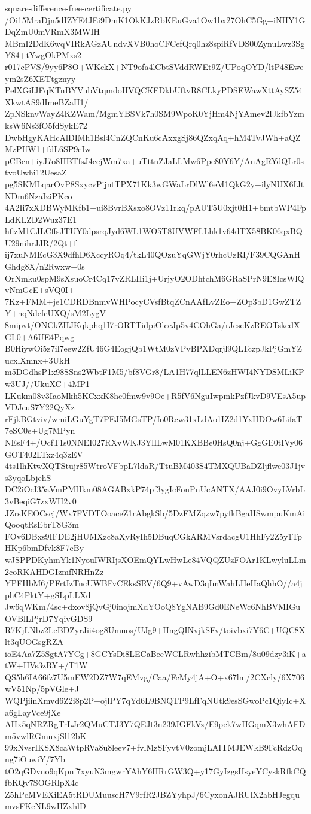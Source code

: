 \documentclass[11pt]{article}
\theoremstyle{definition}
\theoremstyle{remark}
\begin{document}
\begin{filecontents*}[overwrite]{square-difference-free-certificate.py}
/Oi15MraDjn5dIZYE4JEi9DmK1OkKJzRbKEuGva1Ow1bx27OhC5Gg+iNHY1GDqZmU0mVRmX3MWIH
MBmI2DdK6wqVIRkAGzAUndvXVB0hoCFCefQrq0hz8spiRfVDS00ZynuLwz3SgY84+tYwgOkPMxs2
r017cPVS/9yy6P8O+WKckX+NT9ofa4lCbtSVddRWEt9Z/UPoqOYD/ltP48Eweym2sZ6XETtgznyy
PelXGiIJFqKTnBYVubVtqmdoHVQCKFDkbUftvR8CLkyPDSEWawXttAySZ54XkwtAS9dImeBZaH1/
ZpNSknvWayZ4KZWam/MgmYBSVk7h0SM9WpoK0YjHm4NjYAmev2IJkfbYzmksW6Ns3fO5fdSykE72
DwbHgyKAHcAlDIMh1Bsl4CnZQCnKu6cAxxgSj86QZxqAq+hM4TvJWh+aQZMzPIfW1+fdL6SP9eIw
pCBcn+iyJ7o8HBTfsJ4ccjWm7xa+uTttnZJaLLMw6Ppe80Y6Y/AnAgRYdQLr0stvoUwhi12UesaZ
pg5SKMLqarOvP8SxycvPijntTPX71Kk3wGWaLrDlWl6eM1QkG2y+ilyNUX6IJtNDm6NzaIziPKco
4A2Ii7xXDBWyMKfb1+ui8BvrBXsxo8OVz11rkq/pAUT5U0xjt0H1+bmtbWP4FpLdKLZD2Wuz37E1
hflzM1CJLCffsJTUY0dpsrqJyd6WL1WO5T8UVWFLLhk1v64dTX58BK06qxBQU29nihrJJR/2Qt+f
ij7xuNMEcG3X9dfhD6XccyROq4/tkL40QOzuYqGWjY0rhcUzRI/F39CQGAnHGhdg8X/n2Rwxw+0s
OrNmku0spM9sXsuoCr4Cq17vZRLIIi1j+UrjyO2ODhtchM6GRaSPrN9E8IcsWlQvNmGcE+sVQ0I+
7Kz+FMM+je1CDRDBnmvWHPocyCVsfBtqZCnAAfLvZEo+ZOp3bD1GwZTZY+nqNdefcUXQ/sM2LygV
8mipvt/ONCkZHJKqkphq1I7rORTTidpiOlceJp5v4COhGa/rJcseKzREOTskedXGL0+A6UE4Pqwg
B0HiywOi5z7il7eew2ZfU46G4EogjQb1WtM0zVPvBPXDqrjl9QLTczpJkPjGmYZucxlXmnx+3UkH
m5DGdhsP1x98SSns2WbtF1M5/bf8VGr8/LA1H77qlLLEN6zHWI4NYDSMLiKPw3UJ//UkuXC+4MP1
LKukm08v3IaoMkh5KCxxK8hc0fmw9v9Oe+R5fV6NguIwpmkPzfJkvD9VEsA5upVDJcuS7Y22QyXz
rFjkBGtviv/wmiLGuYgT7PEJ5MGsTP/Io0Rcw31xLdAo1IZ2d1YxHDOw6LifaT7eSC0e+Ug7MPyn
NEsF4+/OcfT1s0NNEI027RXvWKJ3YlILwM01KXBBe0HsQ0nj+GgGE0tIVy06GOT402LTxz4q3zEV
4ts1lhKtwXQTStujr85WtroVFbpL7ldaR/TtuBM403S4TMXQUBaDZljflwe03J1jvs3yqoLbjehS
DC2iOcI35aVmPMHkm08AGABxkP74pf3ygIcFonPnUcANTX/AAJ0i9OvyLVrbL3vBeqiG7zxWH2v0
JZrsKEOCscj/Wx7FVDTOoaceZ1rAbgkSb/5DzFMZqzw7pyfkBgaHSwmpuKmAiQooqtRsEbrT8G3m
FOv6DBxs9IFDE2jHUMXzc8aXyRyIh5DBuqCGkARMVsrdacgU1HhFy2Z5y1TpHKp6bmDfvk8F7eBy
wJSPPDKyhmYk1NyouIWRIjsXOEmQYLwHwLe84VQQZUzFOAr1KLwyluLLm2coRKAHDGIzmfNRHnZz
YPFHbM6/PFrtIzTncUWBFvCEksSRV/6Q9+vAwD3qImWahLHeHaQhhO//a4jphC4PktY+gSLpLLXd
Jw6qWKm/4sc+dxov8jQvGj0inojmXdYOoQ8YgNAB9Gd0ENeWc6NhBVMIGuOVBlLPjrD7YqivGDS9
R7KjLNbz2LeBDZyrJii4og8Umuos/UJg9+HngQINvjkSFv/toivbxi7Y6C+UQC8Xlt3qUOGsgRZA
ioE4Aa7Z5SgtA7YCg+8GCYsDi8LECaBeeWCLRwhhzibMTCBm/8u09dzy3iK+atW+HVs3zRY+/T1W
QS5h6IA66fz7U5mEW2DZ7W7qEMvg/Caa/FcMy4jA+O+x67lm/2CXcly/6X706wV51Np/5pVGle+J
WQPjiinXmvd6Z2i8p2P+ojlPY7qYd6L9BNQTP9LfFqNUtk9esSGwoPc1QiyIc+Xa6gLayVce9jXe
AHx5qNRZRgTrLJr2QMuCTJ3Y7QEJt3n239JGFkVz/E9pek7wHGqmX3whAFDm5vwlRGmnxjSl12bK
99xNvsrIKSX8caWtpRVa8u8leev7+fvlMzSFyvtV0zomjLAITMJEWkB9FcRdzOqng7iOuwiY/7Yb
tO2qGDvno9qKpnf7xyuN3mgwrYAhY6HRrGW3Q+y17GyIzgsHsyeYCyskRfkCQfbKQv7SOGRlpX4c
Z5hPcMVEXiEA5tRDUMuuscH7V9rfR2JBZYyhpJ/6CyxonAJRUlX2abHJegqumvsFKeNL9wHZxhlD

\end{filecontents*}
\end{document}
